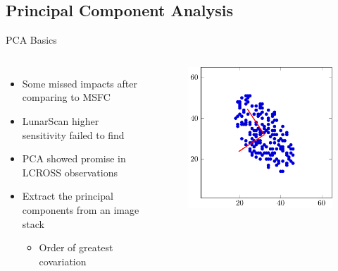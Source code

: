 \documentclass[pdf]{beamer}
\begin{document}
 \subsection{Principal Component Analysis}
 \begin{frame}{PCA Basics}
   \begin{columns}
	 \begin{itemize}
	   \item Some missed impacts after comparing to MSFC
	   \item LunarScan higher sensitivity failed to find
	   \item PCA showed promise in LCROSS observations \citep{Strycker2013}
	   \item Extract the principal components from an image stack
		 \begin{itemize}
		   \item Order of greatest covariation
		 \end{itemize}
	 \end{itemize}
	 \begin{figure}[ht!]
	   \centering
	   \includegraphics[width=\textwidth]{Images/PCA_Sample.pdf}
	 \end{figure}
   \end{columns}
 \end{frame}
\end{document}
